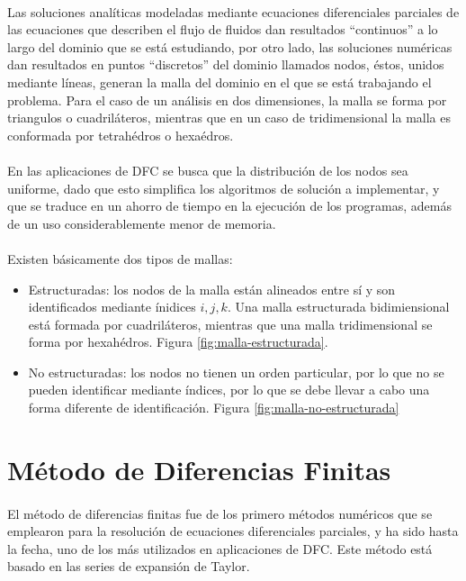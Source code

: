 \documentclass[letterpaper, openright, 12pt]{book}
\begin{document}
	\paragraph*{}
	Las soluciones analíticas modeladas mediante ecuaciones diferenciales parciales de las ecuaciones que describen el flujo de fluidos dan resultados ``continuos'' a lo largo del dominio que se está estudiando, por otro lado, las soluciones numéricas  dan resultados en puntos ``discretos'' del dominio llamados nodos, éstos, unidos mediante líneas, generan la malla del dominio en el que se está trabajando el problema. Para el caso de un análisis en dos dimensiones, la malla se forma por triangulos o cuadriláteros, mientras que en un caso de tridimensional la malla es conformada por tetrahédros o hexaédros. 
	
	\paragraph*{}
	En las aplicaciones de DFC se busca que la distribución de los nodos sea uniforme, dado que esto simplifica los algoritmos de solución a implementar,  y que se traduce en un ahorro de tiempo en la ejecución de los programas, además de un uso considerablemente menor de memoria.
	
	\paragraph*{}
	Existen básicamente dos tipos de mallas:
	\begin{itemize}
		\item Estructuradas: los nodos de la malla están alineados entre sí y son identificados mediante ínidices $i, j, k$. Una malla estructurada bidimiensional está formada por cuadriláteros, mientras que una malla tridimensional se forma por hexahédros. Figura \ref{fig:malla-estructurada}.
		\item No estructuradas: los nodos no tienen un orden particular, por lo que no se pueden identificar mediante índices, por lo que se debe llevar a cabo una forma diferente de identificación. Figura \ref{fig:malla-no-estructurada}
	\end{itemize}
	
	
	
	\section{Método de Diferencias Finitas}
	\paragraph*{}
	El método de diferencias finitas fue de los primero métodos numéricos que se emplearon para la resolución de ecuaciones diferenciales parciales, y ha sido hasta la fecha, uno de los más utilizados en aplicaciones de DFC. Este método está basado en las series de expansión de Taylor.
	
\end{document}
